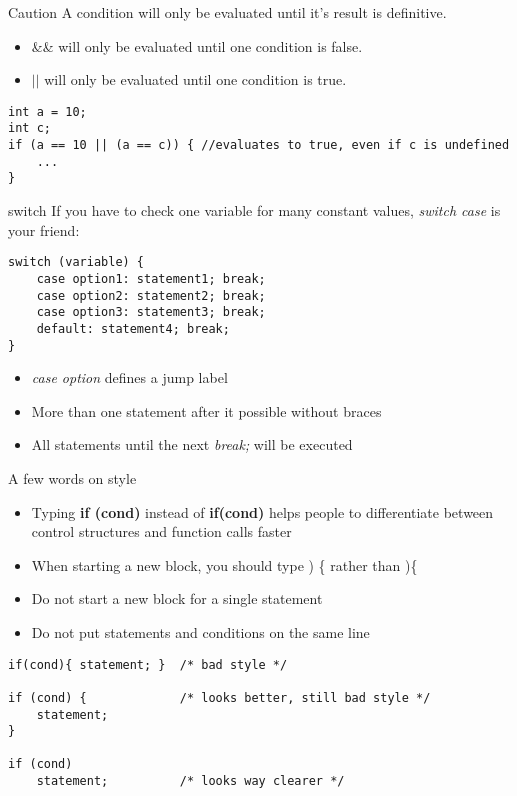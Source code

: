 \begin{frame}[fragile]{Caution}
	A condition will only be evaluated until it's result is definitive.
	\begin{itemize}
	\item \&\& will only be evaluated until one condition is false.
	\item $||$ will only be evaluated until one condition is true.
	\end{itemize}
	\begin{lstlisting}[numbers=none]
int a = 10;
int c;
if (a == 10 || (a == c)) { //evaluates to true, even if c is undefined
	...	
}
\end{lstlisting} 
\end{frame}
\begin{frame}[fragile]{switch}
	If you have to check one variable for many constant values, \textit{switch case} is your friend:
	\begin{lstlisting}[numbers=none,basicstyle=\itshape\footnotesize]
switch (variable) {
	case option1: statement1; break;
	case option2: statement2; break;
	case option3: statement3; break;
	default: statement4; break;
}
\end{lstlisting}
	\begin{itemize}
	\item \textit{case option} defines a jump label
	\item More than one statement after it possible without braces
	\item All statements until the next \textit{break;} will be executed
\end{itemize}	 
\end{frame}
\begin{frame}[fragile]{A few words on style}

	\begin{itemize}
		\item Typing \textbf{if (cond)} instead of \textbf{if(cond)} helps people to differentiate between control structures and function calls faster
		\item When starting a new block, you should type ) \{ rather than )\{
		\item Do not start a new block for a single statement
		\item Do not put statements and conditions on the same line
	\end{itemize}
	\begin{lstlisting}[numbers=none]
if(cond){ statement; }	/* bad style */

if (cond) {				/* looks better, still bad style */
	statement;
}

if (cond)
	statement;			/* looks way clearer */
\end{lstlisting}
\end{frame}
